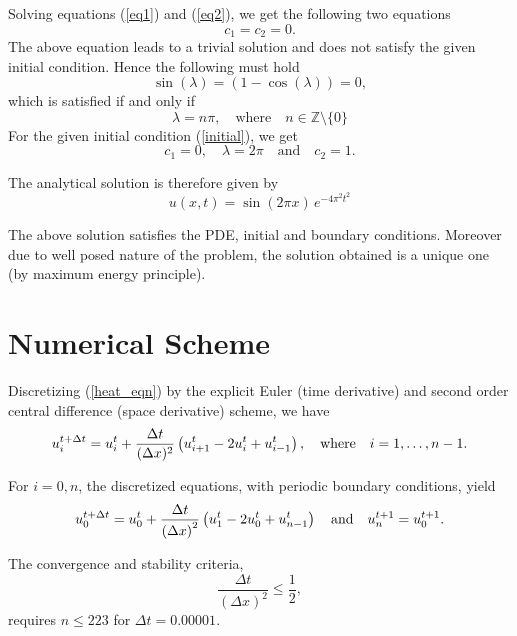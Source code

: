\documentclass[12pt]{article}
\begin{document}
	Solving equations (\ref{eq1}) and (\ref{eq2}), we get the following two equations
	\begin{equation*}
	c_1=c_2=0.
	\end{equation*}
	The above equation leads to a trivial solution and does not satisfy the given initial condition. Hence the following must hold 
	\begin{equation*}
	\sin(\lambda)=(1-\cos(\lambda))=0,
	\end{equation*}	
	which is satisfied if and only if	
	\begin{equation*}
	\lambda = n \pi, \quad \text{where}\quad  n \in \mathbb{Z}\setminus\{0\}
	\end{equation*}	
	For the given initial condition (\ref{initial}), we get	
	\begin{equation*}
	c_1 = 0,\quad \lambda = 2\pi\quad \text{and} \quad c_2 = 1.
	\end{equation*}
	
	The analytical solution is therefore given by	
	\begin{equation}
	u(x,t)= \sin(2 \pi x)\, e^{-4 \pi^2 t^2}
	\end{equation}
	
	The above solution satisfies the PDE, initial and boundary conditions. Moreover due to well posed nature of the problem, the solution obtained is a unique one (by maximum energy principle).
	
	\section{Numerical Scheme}
	Discretizing (\ref{heat_eqn}) by the explicit Euler (time derivative) and second order central difference (space derivative) scheme, we have
	\begin{equation*}
	u^{t+\Delta t}_{i}= u^t_i + {\Delta t \over (\Delta x)^2} \left(u^t_{i+1}-2u^t_i+u^t_{i-1}\right), \quad \text{where} \quad i=1,\ldots,n-1.
	\end{equation*} 
	
	For $i=0,n$, the discretized equations, with periodic boundary conditions, yield 
	\begin{equation*}
	u^{t+\Delta t}_{0}= u^t_0 + {\Delta t \over \left(\Delta x\right)^2} \left(u^t_{1}-2u^t_0+u^t_{n-1}\right) \quad \text{and}\quad 	u^{t+1}_{n}= u^{t+1}_0. 
	\end{equation*} 
	
	The convergence and stability criteria, 
	\begin{equation*}
	\frac{\Delta t}{\left(\Delta x\right)^2} \leq \frac{1}{2},
	\end{equation*}
	requires $n \leq 223$ for $\Delta t=0.00001$.
	
\end{document}
